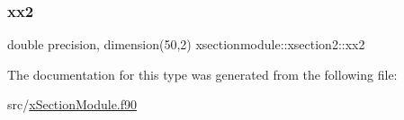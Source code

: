 \mbox{\label{structxsectionmodule_1_1xsection2_aae4866f265eb9ac4def3122364acc6c5}} 
\subsubsection{\texorpdfstring{xx2}{xx2}}
{\footnotesize\ttfamily double precision, dimension(50,2) xsectionmodule\+::xsection2\+::xx2}



The documentation for this type was generated from the following file\+:\begin{DoxyCompactItemize}
\item 
src/\hyperlink{x_section_module_8f90}{x\+Section\+Module.\+f90}\end{DoxyCompactItemize}
